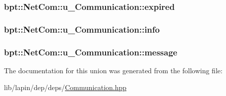 \hypertarget{unionbpt_1_1_net_com_1_1u___communication_af4a62fad004dbfb74937f82de2105030}{
\subsubsection[{expired}]{ bpt\-::\-Net\-Com\-::u\-\_\-\-Communication\-::expired}}\label{unionbpt_1_1_net_com_1_1u___communication_af4a62fad004dbfb74937f82de2105030}
\hypertarget{unionbpt_1_1_net_com_1_1u___communication_af1d91eb90a3f757e08f91dd114559774}{
\subsubsection[{info}]{ bpt\-::\-Net\-Com\-::u\-\_\-\-Communication\-::info}}\label{unionbpt_1_1_net_com_1_1u___communication_af1d91eb90a3f757e08f91dd114559774}
\hypertarget{unionbpt_1_1_net_com_1_1u___communication_a731a136641ce8db013431bfe2653eff1}{
\subsubsection[{message}]{ bpt\-::\-Net\-Com\-::u\-\_\-\-Communication\-::message}}\label{unionbpt_1_1_net_com_1_1u___communication_a731a136641ce8db013431bfe2653eff1}


The documentation for this union was generated from the following file\-:\begin{DoxyCompactItemize}
\item 
lib/lapin/dep/deps/\hyperlink{_communication_8hpp}{Communication.\-hpp}\end{DoxyCompactItemize}
